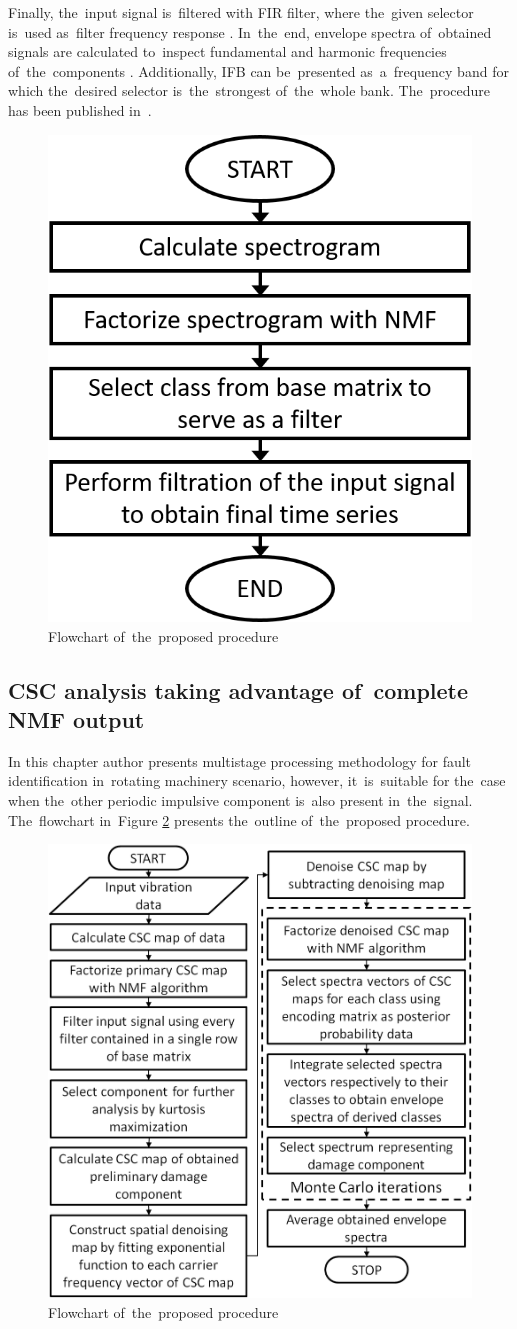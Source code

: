 Finally, the~input signal is~filtered with FIR filter, where the~given selector is~used as~filter frequency response \cite{alan1989discrete}. In~the~end, envelope spectra of~obtained signals are calculated to~inspect fundamental and harmonic frequencies of~the~components \cite{randall2011rolling}. Additionally, IFB can be~presented as~a~frequency band for which the~desired selector is~the~strongest of~the~whole bank. The~procedure has been published in~\cite{wodecki2017novel}.

\begin{figure}[ht!]
\centering
\includegraphics[width=.4\textwidth]{wykresy/met_base_nmf.png}
\caption{Flowchart of~the~proposed procedure}
\label{fig:met_base_nmf}
\end{figure}

\subsection{CSC analysis taking advantage of~complete NMF output}\label{met_nmf_both}

In this chapter author presents multistage processing methodology for fault identification in~rotating machinery scenario, however, it~is~suitable for the~case when the~other periodic impulsive component is~also present in~the~signal. The~flowchart in~Figure \ref{fig:met_mcnmf} presents the~outline of~the~proposed procedure.

\begin{figure}[ht!]
\centering
\includegraphics[width=.7\textwidth]{wykresy/met_mcnmf.png}
\caption{Flowchart of~the~proposed procedure}
\label{fig:met_mcnmf}
\end{figure}

